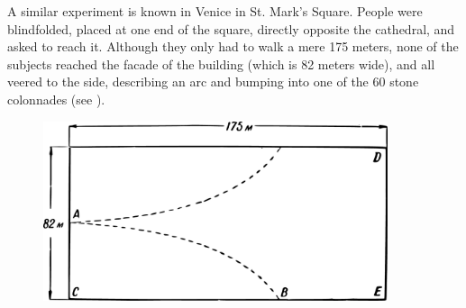A similar experiment is known in Venice in St. Mark's Square. People were blindfolded, placed at one end of the square, directly opposite the cathedral, and asked to reach it. Although they only had to walk a mere 175 meters, none of the subjects reached the facade of the building (which is 82 meters wide), and all veered to the side, describing an arc and bumping into one of the 60 stone colonnades (see ).


\begin{figure}[h!]
\centering
\includegraphics[width=0.9\textwidth]{figures/ch-08/fig-112.pdf}
\end{figure}


